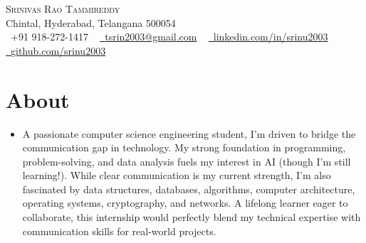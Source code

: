 \documentclass[a4paper,11pt]{article}
\begin{document}

\begin{center}

    {\Huge \scshape Srinivas Rao Tammireddy} \\ \vspace{2pt}
    Chintal, Hyderabad, Telangana 500054 \\ \vspace{1pt}
    \small \raisebox{-0.1\height}
    \faPhone\ +91 918-272-1417 ~
    \href{mailto:tsrin2003@gmail.com}{\raisebox{-0.2\height}\faEnvelope\  {tsrin2003@gmail.com}} ~
    \href{https://linkedin.com/in/srinu2003/}{\raisebox{-0.2\height}\faLinkedin\ {linkedin.com/in/srinu2003}}  ~
    \href{https://github.com/srinu2003}{\raisebox{-0.2\height}\faGithub\ {github.com/srinu2003}}
    \vspace{-8pt}
  \end{center}

\section{About}
  \begin{itemize}[leftmargin=0.15in, label={}]
    \item \fontsize{10}{12} \selectfont
    A passionate computer science engineering student, I'm driven to bridge the communication gap in technology. My strong foundation in programming, problem-solving, and data analysis fuels my interest in AI (though I'm still learning!). While clear communication is my current strength, I'm also fascinated by data structures, databases, algorithms, computer architecture, operating systems, cryptography, and networks. A lifelong learner eager to collaborate, this internship would perfectly blend my technical expertise with communication skills for real-world projects.
  \end{itemize}
    
\end{document}

